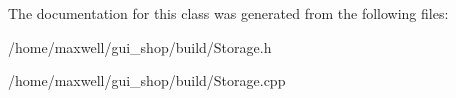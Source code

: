 

The documentation for this class was generated from the following files\+:\begin{DoxyCompactItemize}
\item 
/home/maxwell/gui\+\_\+shop/build/Storage.\+h\item 
/home/maxwell/gui\+\_\+shop/build/Storage.\+cpp\end{DoxyCompactItemize}
